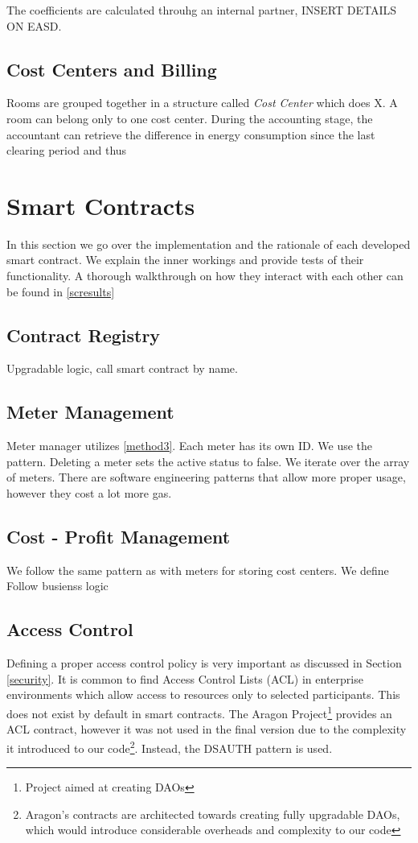 The coefficients are calculated throuhg an internal partner, INSERT DETAILS ON EASD.

\subsection{Cost Centers and Billing}

Rooms are grouped together in a structure called \textit{Cost Center} which does X. A room can belong only to one cost center. During the accounting stage, the accountant can retrieve the difference in energy consumption since the last clearing period and thus


\section{Smart Contracts}

In this section we go over the implementation and the rationale of each developed smart contract. We explain the inner workings and provide tests of their functionality. A thorough walkthrough on how they interact with each other can be found in \ref{scresults}
\subsection{Contract Registry}
Upgradable logic, call smart contract by name.

\subsection{Meter Management}
Meter manager utilizes \ref{method3}. Each meter has its own ID. We use the pattern. Deleting a meter sets the active status to false. We iterate over the array of meters. There are software engineering patterns \cite{crud} that allow more proper usage, however they cost a lot more gas. 

\subsection{Cost - Profit Management}
We follow the same pattern as with meters for storing cost centers. We define 
Follow busienss logic

\subsection{Access Control}
Defining a proper access control policy is very important as discussed in Section \ref{security}. It is common to find Access Control Lists (ACL) in enterprise environments which allow access to resources only to selected participants. This does not exist by default in smart contracts. The Aragon Project\footnote{Project aimed at creating DAOs} provides an ACL contract, however it was not used in the final version due to the complexity it introduced to our code\footnote{Aragon's contracts are architected towards creating fully upgradable DAOs, which would introduce considerable overheads and complexity to our code}. Instead, the DSAUTH pattern is used.

